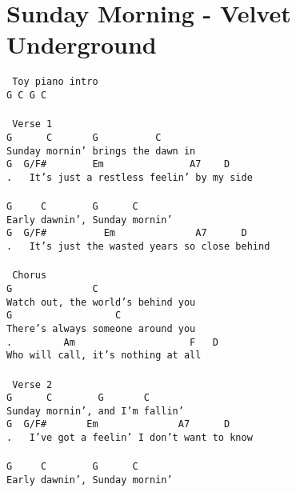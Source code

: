 \newpage
\section{Sunday Morning - Velvet Underground}
\label{Sunday Morning - Velvet Underground}
\texttt{\lbrack\ Toy\ piano\ intro\rbrack\\
G\ C\ G\ C\\
\\
\lbrack\ Verse\ 1\rbrack\\
G\ \ \ \ \ \ C\ \ \ \ \ \ \ G\ \ \ \ \ \ \ \ \ \ C\\
Sunday\ mornin'\ brings\ the\ dawn\ in\\
G\ \ G/F\#\ \ \ \ \ \ \ \ Em\ \ \ \ \ \ \ \ \ \ \ \ \ \ \ A7\ \ \ \ D\\
.\ \ \ It's\ just\ a\ restless\ feelin'\ by\ my\ side\\
\\
G\ \ \ \ \ C\ \ \ \ \ \ \ \ G\ \ \ \ \ \ C\\
Early\ dawnin',\ Sunday\ mornin'\\
G\ \ G/F\#\ \ \ \ \ \ \ \ \ \ Em\ \ \ \ \ \ \ \ \ \ \ \ \ \ A7\ \ \ \ \ \ D\\
.\ \ \ It's\ just\ the\ wasted\ years\ so\ close\ behind\\
\\
\lbrack\ Chorus\rbrack\\
G\ \ \ \ \ \ \ \ \ \ \ \ \ \ C\\
Watch\ out,\ the\ world's\ behind\ you\\
G\ \ \ \ \ \ \ \ \ \ \ \ \ \ \ \ \ \ C\\
There's\ always\ someone\ around\ you\\
.\ \ \ \ \ \ \ \ \ Am\ \ \ \ \ \ \ \ \ \ \ \ \ \ \ \ \ \ \ \ F\ \ \ D\\
Who\ will\ call,\ it's\ nothing\ at\ all\\
\\
\lbrack\ Verse\ 2\rbrack\\
G\ \ \ \ \ \ C\ \ \ \ \ \ \ \ G\ \ \ \ \ \ \ C\\
Sunday\ mornin',\ and\ I'm\ fallin'\\
G\ \ G/F\#\ \ \ \ \ \ \ Em\ \ \ \ \ \ \ \ \ \ \ \ \ \ A7\ \ \ \ \ \ D\\
.\ \ \ I've\ got\ a\ feelin'\ I\ don't\ want\ to\ know\\
\\
G\ \ \ \ \ C\ \ \ \ \ \ \ \ G\ \ \ \ \ \ C\\
Early\ dawnin',\ Sunday\ mornin'\\
}
